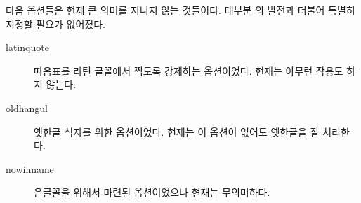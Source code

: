 \documentclass[
	12pt,
	a4paper,
	kosection,
	footnote,
	nobookmarks,
	microtype,
]{oblivoir}
\newcommand\obclass{ob\-liv\-oir\oblivoirallowbreak}
\begin{document}
\bigskip

다음 옵션들은 현재 큰 의미를 지니지 않는 것들이다. 대부분 \koTeX 의 발전과 더불어  특별히 지정할 필요가 없어졌다.
\begin{description}
\item [latinquote] 따옴표를 라틴 글꼴에서 찍도록 강제하는 옵션이었다. 현재는 아무런 작용도 하지 않는다.
\item [oldhangul] 옛한글 식자를 위한 옵션이었다. 현재는 이 옵션이 없어도 옛한글을 잘 처리한다.
\item [nowinname] 은글꼴을 위해서 마련된 옵션이었으나 현재는 무의미하다.
\end{description}


\end{document}
